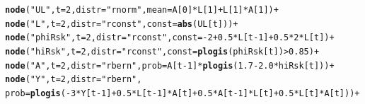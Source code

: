 \documentclass{article}\usepackage[]{graphicx}\usepackage[]{color}
\makeatletter
\newcommand{\hlnum}[1]{\textcolor[rgb]{0.686,0.059,0.569}{#1}}%
\newcommand{\hlstr}[1]{\textcolor[rgb]{0.192,0.494,0.8}{#1}}%
\newcommand{\hlopt}[1]{\textcolor[rgb]{0,0,0}{#1}}%
\newcommand{\hlstd}[1]{\textcolor[rgb]{0.345,0.345,0.345}{#1}}%
\newcommand{\hlkwc}[1]{\textcolor[rgb]{0.333,0.667,0.333}{#1}}%
\newcommand{\hlkwd}[1]{\textcolor[rgb]{0.737,0.353,0.396}{\textbf{#1}}}%
\newenvironment{kframe}{%
 \def\at@end@of@kframe{}%
 \ifinner\ifhmode%
  \def\at@end@of@kframe{\end{minipage}}%
  \begin{minipage}{\columnwidth}%
 \fi\fi%
 \def\FrameCommand##1{\hskip\@totalleftmargin \hskip-\fboxsep
 \colorbox{shadecolor}{##1}\hskip-\fboxsep
     \hskip-\linewidth \hskip-\@totalleftmargin \hskip\columnwidth}%
 \MakeFramed {\advance\hsize-\width
   \@totalleftmargin\z@ \linewidth\hsize
   \@setminipage}}%
 {\par\unskip\endMakeFramed%
 \at@end@of@kframe}
\newenvironment{knitrout}{}{} %
\makeatother
\begin{document}
\begin{knitrout}
\begin{kframe}
\begin{alltt}
    \hlkwd{node}\hlstd{(}\hlstr{"UL"}\hlstd{,}\hlkwc{t} \hlstd{=} \hlnum{2}\hlstd{,} \hlkwc{distr} \hlstd{=} \hlstr{"rnorm"}\hlstd{,} \hlkwc{mean} \hlstd{= A[}\hlnum{0}\hlstd{]}\hlopt{*}\hlstd{L[}\hlnum{1}\hlstd{]} \hlopt{+} \hlstd{L[}\hlnum{1}\hlstd{]}\hlopt{*}\hlstd{A[}\hlnum{1}\hlstd{])} \hlopt{+}
    \hlkwd{node}\hlstd{(}\hlstr{"L"}\hlstd{,} \hlkwc{t} \hlstd{=} \hlnum{2}\hlstd{,} \hlkwc{distr} \hlstd{=} \hlstr{"rconst"}\hlstd{,} \hlkwc{const} \hlstd{=} \hlkwd{abs}\hlstd{(UL[t]))} \hlopt{+}
    \hlkwd{node}\hlstd{(}\hlstr{"phiRsk"}\hlstd{,} \hlkwc{t} \hlstd{=} \hlnum{2}\hlstd{,} \hlkwc{distr} \hlstd{=} \hlstr{"rconst"}\hlstd{,} \hlkwc{const} \hlstd{=} \hlopt{-}\hlnum{2} \hlopt{+} \hlnum{0.5}\hlopt{*}\hlstd{L[t}\hlopt{-}\hlnum{1}\hlstd{]} \hlopt{+} \hlnum{0.5}\hlopt{*}\hlnum{2}\hlopt{*}\hlstd{L[t])} \hlopt{+}
    \hlkwd{node}\hlstd{(}\hlstr{"hiRsk"}\hlstd{,} \hlkwc{t} \hlstd{=} \hlnum{2}\hlstd{,} \hlkwc{distr} \hlstd{=} \hlstr{"rconst"}\hlstd{,} \hlkwc{const} \hlstd{=} \hlkwd{plogis}\hlstd{(phiRsk[t])} \hlopt{>} \hlnum{0.85}\hlstd{)} \hlopt{+}
    \hlkwd{node}\hlstd{(}\hlstr{"A"}\hlstd{,} \hlkwc{t} \hlstd{=} \hlnum{2}\hlstd{,} \hlkwc{distr} \hlstd{=} \hlstr{"rbern"}\hlstd{,} \hlkwc{prob} \hlstd{= A[t}\hlopt{-}\hlnum{1}\hlstd{]}\hlopt{*}\hlkwd{plogis}\hlstd{(}\hlnum{1.7} \hlopt{-} \hlnum{2.0}\hlopt{*}\hlstd{hiRsk[t]))} \hlopt{+}
    \hlkwd{node}\hlstd{(}\hlstr{"Y"}\hlstd{,} \hlkwc{t} \hlstd{=} \hlnum{2}\hlstd{,} \hlkwc{distr} \hlstd{=} \hlstr{"rbern"}\hlstd{,}
      \hlkwc{prob} \hlstd{=} \hlkwd{plogis}\hlstd{(}\hlopt{-}\hlnum{3}\hlopt{*}\hlstd{Y[t}\hlopt{-}\hlnum{1}\hlstd{]} \hlopt{+} \hlnum{0.5}\hlopt{*}\hlstd{L[t}\hlopt{-}\hlnum{1}\hlstd{]}\hlopt{*}\hlstd{A[t]} \hlopt{+} \hlnum{0.5}\hlopt{*}\hlstd{A[t}\hlopt{-}\hlnum{1}\hlstd{]}\hlopt{*}\hlstd{L[t]} \hlopt{+} \hlnum{0.5}\hlopt{*}\hlstd{L[t]}\hlopt{*}\hlstd{A[t]))} \hlopt{+}


\end{alltt}
\end{kframe}
\end{knitrout}
\end{document}
